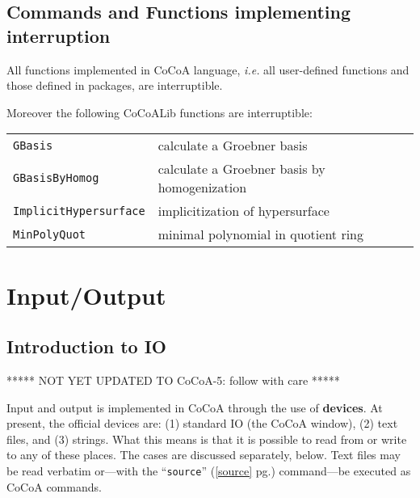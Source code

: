 \documentclass[a4paper]{mybook}
\begin{document}
\section{Commands and Functions implementing interruption}
\label{Commands and Functions implementing interruption}

        
All functions implemented in CoCoA language,
\textit{i.e.} all user-defined functions and those defined in packages,
are interruptible.
\par 
Moreover the following CoCoALib functions are interruptible:

\begin{center}
\begin{longtable}{ll}
   
{\verb~GBasis~} &
      calculate a Groebner basis\\
   
{\verb~GBasisByHomog~} &
      calculate a Groebner basis by homogenization\\
   
{\verb~ImplicitHypersurface~} &
      implicitization of hypersurface\\
   
{\verb~MinPolyQuot~} &
      minimal polynomial in quotient ring\\
   
\end{longtable}
\end{center}

\noindent



\chapter{Input/Output}
\label{Input/Output}

      

\section{Introduction to IO}
\label{Introduction to IO}

        
***** NOT YET UPDATED TO CoCoA-5: follow with care *****
\par 
Input and output is implemented in CoCoA through the use of
\textbf{devices}.  At present, the official devices are: (1) standard IO (the
CoCoA window), (2) text files, and (3) strings.  What this means is that
it is possible to read from or write to any of these places.  The
cases are discussed separately, below.  Text files may be read
verbatim or---with the ``\verb&source&'' (\ref{source} pg.\pageref{source}) command---be executed as CoCoA
commands.
\end{document}
